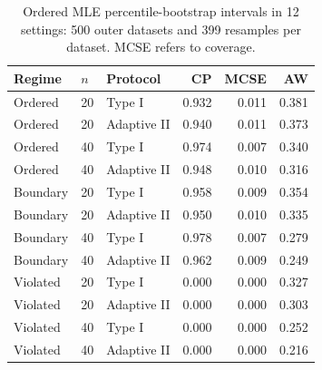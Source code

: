 \begin{table}[htbp]
\centering
\caption{Ordered MLE percentile-bootstrap intervals in 12 settings: 500 outer datasets and 399 resamples per dataset. MCSE refers to coverage.}\label{tab:bootstrap}
\small
\begin{tabular}{lllrrr}
\toprule
Regime & $n$ & Protocol & CP & MCSE & AW \\
\midrule
Ordered & 20 & Type I & 0.932 & 0.011 & 0.381 \\
Ordered & 20 & Adaptive II & 0.940 & 0.011 & 0.373 \\
Ordered & 40 & Type I & 0.974 & 0.007 & 0.340 \\
Ordered & 40 & Adaptive II & 0.948 & 0.010 & 0.316 \\
Boundary & 20 & Type I & 0.958 & 0.009 & 0.354 \\
Boundary & 20 & Adaptive II & 0.950 & 0.010 & 0.335 \\
Boundary & 40 & Type I & 0.978 & 0.007 & 0.279 \\
Boundary & 40 & Adaptive II & 0.962 & 0.009 & 0.249 \\
Violated & 20 & Type I & 0.000 & 0.000 & 0.327 \\
Violated & 20 & Adaptive II & 0.000 & 0.000 & 0.303 \\
Violated & 40 & Type I & 0.000 & 0.000 & 0.252 \\
Violated & 40 & Adaptive II & 0.000 & 0.000 & 0.216 \\
\bottomrule
\end{tabular}
\end{table}
